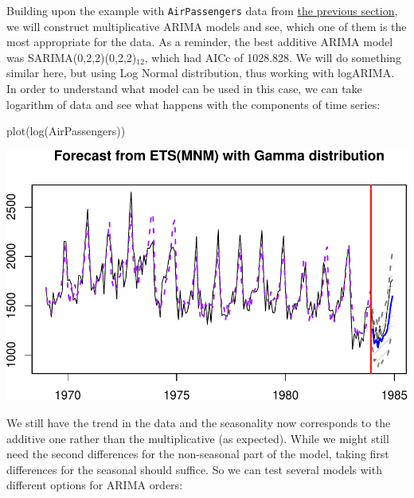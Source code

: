 \documentclass[
]{book}
\newenvironment{Shaded}{\begin{snugshade}}{\end{snugshade}}
\newcommand{\FunctionTok}[1]{\textcolor[rgb]{0.00,0.00,0.00}{#1}}
\newcommand{\NormalTok}[1]{#1}
\theoremstyle{definition}
\theoremstyle{definition}
\theoremstyle{definition}
\theoremstyle{definition}
\theoremstyle{remark}
\begin{document}
Building upon the example with \texttt{AirPassengers} data from \protect\hyperlink{ARIMAExampleInRSeasonal}{the previous section}, we will construct multiplicative ARIMA models and see, which one of them is the most appropriate for the data. As a reminder, the best additive ARIMA model was SARIMA(0,2,2)(0,2,2)\(_{12}\), which had AICc of 1028.828. We will do something similar here, but using Log Normal distribution, thus working with logARIMA. In order to understand what model can be used in this case, we can take logarithm of data and see what happens with the components of time series:

\begin{Shaded}
\begin{Highlighting}[]
\FunctionTok{plot}\NormalTok{(}\FunctionTok{log}\NormalTok{(AirPassengers))}
\end{Highlighting}
\end{Shaded}

\includegraphics{adam_files/figure-latex/unnamed-chunk-66-1.pdf}

We still have the trend in the data and the seasonality now corresponds to the additive one rather than the multiplicative (as expected). While we might still need the second differences for the non-seasonal part of the model, taking first differences for the seasonal should suffice. So we can test several models with different options for ARIMA orders:
\end{document}
